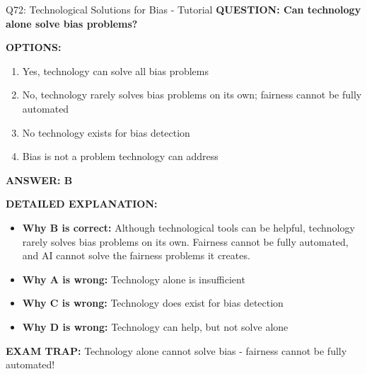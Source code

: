 \documentclass[8pt]{beamer}
\begin{document}
	\begin{frame}{Q72: Technological Solutions for Bias - Tutorial}
		\fontsize{6.5}{7.5}\selectfont
		\textbf{QUESTION: Can technology alone solve bias problems?}
		
		\vspace{0.1cm}
		\textbf{OPTIONS:}
		\begin{enumerate}
			\item Yes, technology can solve all bias problems
			\item No, technology rarely solves bias problems on its own; fairness cannot be fully automated
			\item No technology exists for bias detection
			\item Bias is not a problem technology can address
		\end{enumerate}
		
		\vspace{0.1cm}
		\textcolor{myblue}{\textbf{ANSWER: B}}
		
		\vspace{0.1cm}
		\textbf{DETAILED EXPLANATION:}
		\begin{itemize}
			\item \textbf{Why B is correct:} Although technological tools can be helpful, technology rarely solves bias problems on its own. Fairness cannot be fully automated, and AI cannot solve the fairness problems it creates.
			\item \textbf{Why A is wrong:} Technology alone is insufficient
			\item \textbf{Why C is wrong:} Technology does exist for bias detection
			\item \textbf{Why D is wrong:} Technology can help, but not solve alone
		\end{itemize}
		
		\textcolor{myred}{\textbf{EXAM TRAP:}} Technology alone \textcolor{myblue}{cannot solve bias} - fairness cannot be fully automated!
	\end{frame}
	
\end{document}
